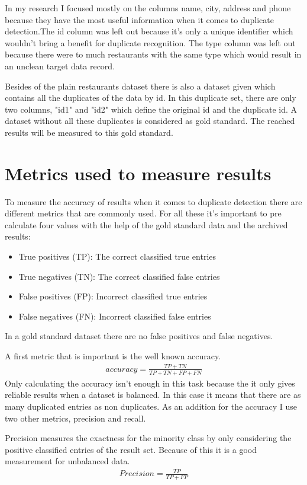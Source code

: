 \documentclass[conference]{IEEEtran}
\begin{document}
In my research I focused mostly on the columns name, city, address and phone because they have the most useful information when it comes to duplicate detection.The id column was left out because it's only a unique identifier which wouldn't bring a benefit for duplicate recognition. The type column was left out because there were to much restaurants with the same type which would result in an unclean target data record.

Besides of the plain restaurants dataset there is also a dataset given which contains all the duplicates of the data by id. In this duplicate set, there are only two columns, "id1" and "id2" which define the original id and the duplicate id. A dataset without all these duplicates is considered as gold standard. The reached results will be measured to this gold standard.
\section{Metrics used to measure results}
To measure the accuracy of results when it comes to duplicate detection there are different metrics that are commonly used. For all these it's important to pre calculate four values with the help of the gold standard data and the archived results: 
\begin{itemize}
	\item True positives (TP): The correct classified true entries
	\item True negatives (TN): The correct classified false entries
	\item False positives (FP): Incorrect classified true entries
	\item False negatives (FN): Incorrect classified false entries
\end{itemize}
In a gold standard dataset there are no false positives and false negatives.

A first metric that is important is the well known accuracy. 
\begin{align}
 accuracy =  \frac{TP + TN}{TP + TN + FP + FN}
\end{align}
Only calculating the accuracy isn't enough in this task because the it only gives reliable results when a dataset is balanced. In this case it means that there are as many duplicated entries as non duplicates. As an addition for the accuracy I use two other metrics, precision and recall.

Precision measures the exactness for the minority class by only considering the positive classified entries of the result set. Because of this it is a good measurement for unbalanced data.
\begin{align}
	Precision = \frac{TP}{TP + FP}
\end{align}
 
\end{document}
